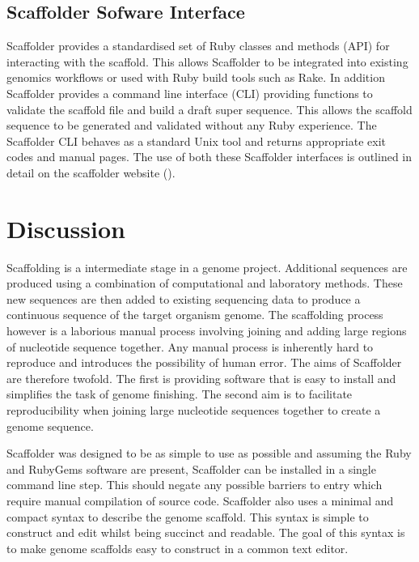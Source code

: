 \documentclass[10pt]{bmc_article}
\newenvironment{bmcformat}{\begin{raggedright}\baselineskip20pt\sloppy\setboolean{publ}{false}}{\end{raggedright}\baselineskip20pt\sloppy}
\begin{document}
\begin{bmcformat}
\subsection{Scaffolder Sofware Interface} %

Scaffolder provides a standardised set of Ruby classes and methods (API) for
interacting with the scaffold. This allows Scaffolder to be integrated into
existing genomics workflows or used with Ruby build tools such as Rake. In
addition Scaffolder provides a command line interface (CLI) providing functions
to validate the scaffold file and build a draft super sequence. This allows the
scaffold sequence to be generated and validated without any Ruby experience.
The Scaffolder CLI behaves as a standard Unix tool and returns appropriate exit
codes and manual pages. The use of both these Scaffolder interfaces is outlined
in detail on the scaffolder website (\scaffolder). \pb

\section*{Discussion} %

Scaffolding is a intermediate stage in a genome project. Additional sequences
are produced using a combination of computational and laboratory methods. These
new sequences are then added to existing sequencing data to produce
a continuous sequence of the target organism genome. The scaffolding process
however is a laborious manual process involving joining and adding large
regions of nucleotide sequence together. Any manual process is inherently hard
to reproduce and introduces the possibility of human error. The aims of
Scaffolder are therefore twofold. The first is providing software that is easy
to install and simplifies the task of genome finishing. The second aim is to
facilitate reproducibility when joining large nucleotide sequences together to
create a genome sequence. \pb

Scaffolder was designed to be as simple to use as possible and assuming the
Ruby and RubyGems software are present, Scaffolder can be installed in a single
command line step. This should negate any possible barriers to entry which
require manual compilation of source code. Scaffolder also uses a minimal and
compact syntax to describe the genome scaffold. This syntax is simple to
construct and edit whilst being succinct and readable. The goal of this syntax
is to make genome scaffolds easy to construct in a common text editor. \pb


\end{bmcformat}
\end{document}

